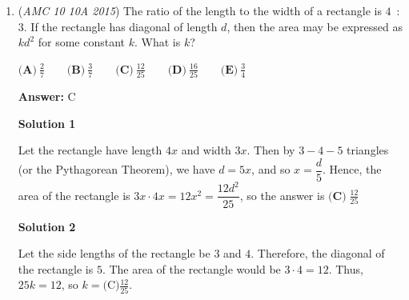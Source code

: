 \begin{enumerate}
 



\textbf{Solution 3}

We note that $a$ must be adjacent to $c$ or $d$, $b$ must be adjacent to $d$, $c$ must be adjacent to $a$, and $d$ must be adjacent to $a$ or $b$. In other words, the way the letters can be connected is 
 \[c-a-d-b.\] Therefore, the only two possible arrangements are $cadb$ and $bdac$, which gives $\boxed{\textbf{(C)}\ 2}$.

 


 



\textbf{Solution 4}

Notice that $b$ and $c$ cannot be in the middle because they would be forced to be next to at least one letter that is next to them in the alphabet(For example, if $b$ was in the middle the only letter that can be next to $b$ is $d$ but since it's in the middle it needs another letter, which means that it's not possible). Therefore you either have a case starting with $b$(then it has to be followed by $d$ then $a$ then $c$) or starting with $c$, amounting to $\boxed{\textbf{(C)}\ 2}$ cases

 


 


 


	\item (\textit{AMC 10 10A 2015}) The ratio of the length to the width of a rectangle is $4$ : $3$. If the rectangle has diagonal of length $d$, then the area may be expressed as $kd^2$ for some constant $k$. What is $k$?


 $\textbf{(A)}\ \frac{2}{7}\qquad\textbf{(B)}\ \frac{3}{7}\qquad\textbf{(C)}\ \frac{12}{25}\qquad\textbf{(D)}\ \frac{16}{25}\qquad\textbf{(E)}\ \frac{3}{4}$

 \textbf{Answer: }C



\textbf{Solution 1}

Let the rectangle have length $4x$ and width $3x$. Then by $3-4-5$ triangles (or the Pythagorean Theorem), we have $d = 5x$, and so $x = \dfrac{d}{5}$. Hence, the area of the rectangle is $3x \cdot 4x = 12x^2 = \dfrac{12d^2}{25}$, so the answer is $\boxed{\textbf{(C)}\;\frac{12}{25}}$




\textbf{Solution 2}

Let the side lengths of the rectangle be $3$ and $4$. Therefore, the diagonal of the rectangle is $5$. The area of the rectangle would be $3\cdot{4}=12.$ Thus, $25k=12$, so $k=\boxed{\text{(C)} \frac{12}{25}}.$




\end{enumerate}
